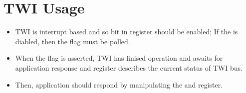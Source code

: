 \section{TWI Usage}
\begin{itemize}
    \item TWI is interrupt based and so  bit in  register should be enabled; If the  is diabled, then the  flag must be polled.
    \item When the  flag is asserted, TWI has finised operation and awaits for application response and  register describes the current status of TWI bus.
    \item Then, application should respond by manipulating the  and  register.
\end{itemize}

